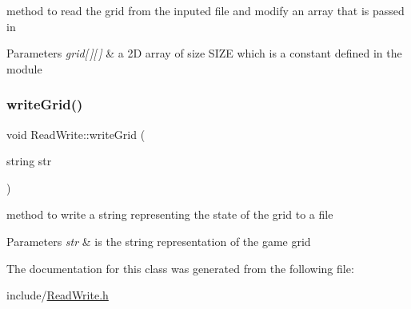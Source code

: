 method to read the grid from the inputed file and modify an array that is passed in 


\begin{DoxyParams}{Parameters}
{\em grid\mbox{[}$\,$\mbox{]}\mbox{[}$\,$\mbox{]}} & a 2D array of size S\+I\+ZE which is a constant defined in the module \\
\hline
\end{DoxyParams}
\mbox{\label{class_read_write_a48aaf174d30259941f8bc28c7a097254}} 
\subsubsection{\texorpdfstring{writeGrid()}{writeGrid()}}
{\footnotesize\ttfamily void Read\+Write\+::write\+Grid (\begin{DoxyParamCaption}\item[{string}]{str }\end{DoxyParamCaption})}



method to write a string representing the state of the grid to a file 


\begin{DoxyParams}{Parameters}
{\em str} & is the string representation of the game grid \\
\hline
\end{DoxyParams}


The documentation for this class was generated from the following file\+:\begin{DoxyCompactItemize}
\item 
include/\mbox{\hyperlink{_read_write_8h}{Read\+Write.\+h}}\end{DoxyCompactItemize}
